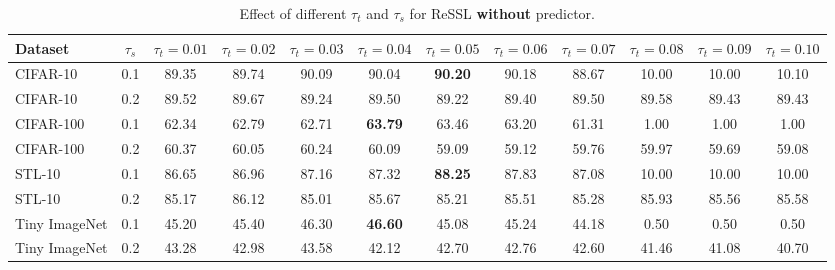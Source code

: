 \documentclass{article}
\newcommand{\<}{\left\langle}
\renewcommand{\>}{\right\rangle}
\begin{document}
\renewcommand\arraystretch{1.0}
\begin{table*}[h]
 \centering
 \setlength\tabcolsep{3pt}
 \caption{Effect of different $\tau_t$ and $\tau_s$ for ReSSL \textbf{without} predictor.}
 \vspace{-10pt}
 \label{table:ablation_t}
\begin{tabular}{l c c c c c c c c c c c} 
\toprule 
Dataset        & $\tau_s$ & $\tau_t = 0.01$ & $\tau_t = 0.02$ & $\tau_t = 0.03$ & $\tau_t = 0.04$ & $\tau_t = 0.05$ & $\tau_t = 0.06$ & $\tau_t = 0.07$ & $\tau_t = 0.08$  & $\tau_t = 0.09$  & $\tau_t = 0.10$ \\  \hline
CIFAR-10       & 0.1 & 89.35  & 89.74 & 90.09 & 90.04 & \textbf{90.20} & 90.18 & 88.67 &  \textcolor{collapsed}{10.00} &  \textcolor{collapsed}{10.00} & \textcolor{collapsed}{10.10} \\
CIFAR-10       & 0.2 & 89.52  & 89.67 & 89.24 & 89.50 & 89.22 & 89.40 & 89.50 & 89.58 & 89.43 & 89.43 \\ \hline
CIFAR-100      & 0.1 & 62.34  & 62.79 & 62.71 & \textbf{63.79} & 63.46 & 63.20 & 61.31 &  \textcolor{collapsed}{1.00} &  \textcolor{collapsed}{1.00} &  \textcolor{collapsed}{1.00} \\
CIFAR-100      & 0.2 & 60.37  & 60.05 & 60.24 & 60.09 & 59.09 & 59.12 & 59.76 & 59.97 & 59.69 & 59.08 \\ \hline
STL-10         & 0.1 & 86.65  & 86.96 & 87.16 & 87.32 & \textbf{88.25} & 87.83 & 87.08 & \textcolor{collapsed}{10.00} &  \textcolor{collapsed}{10.00} &  \textcolor{collapsed}{10.00} \\
STL-10         & 0.2 & 85.17  & 86.12 & 85.01 & 85.67 & 85.21 & 85.51 & 85.28 & 85.93 & 85.56 & 85.58 \\ \hline
Tiny ImageNet  & 0.1 & 45.20  & 45.40 & 46.30 & \textbf{46.60} & 45.08 & 45.24 & 44.18 &  \textcolor{collapsed}{0.50} &  \textcolor{collapsed}{0.50} &  \textcolor{collapsed}{0.50} \\
Tiny ImageNet  & 0.2 & 43.28  & 42.98 & 43.58 & 42.12 & 42.70 & 42.76 & 42.60 & 41.46 & 41.08 & 40.70 \\
\bottomrule 
\end{tabular}
\vspace{-10pt}
\end{table*}
\end{document}
